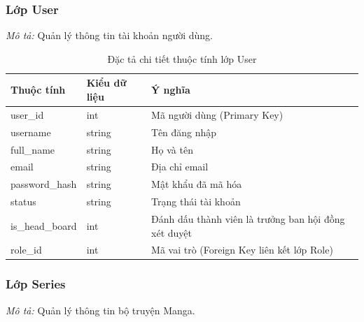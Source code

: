 \subsubsection{Lớp User}
\textit{Mô tả:} Quản lý thông tin tài khoản người dùng.

\begin{table}[H]
\centering
\renewcommand{\arraystretch}{1.3}
\begin{tabularx}{\textwidth}{|p{4cm}|p{3cm}|>{\raggedright\arraybackslash}X|}
\hline
\rowcolor{tableheader}
\textbf{Thuộc tính} & \textbf{Kiểu dữ liệu} & \textbf{Ý nghĩa} \\ \hline
user\_id & int & Mã người dùng (Primary Key) \\ \hline
username & string & Tên đăng nhập \\ \hline
full\_name & string & Họ và tên \\ \hline
email & string & Địa chỉ email \\ \hline
password\_hash & string & Mật khẩu đã mã hóa \\ \hline
status & string & Trạng thái tài khoản \\ \hline
is\_head\_board & int & Đánh dấu thành viên là trưởng ban hội đồng xét duyệt \\ \hline
role\_id & int & Mã vai trò (Foreign Key liên kết lớp Role) \\ \hline
\end{tabularx}
\caption{Đặc tả chi tiết thuộc tính lớp User}
\label{tab:class_user}
\end{table}


\subsubsection{Lớp Series}
\textit{Mô tả:} Quản lý thông tin bộ truyện Manga.


